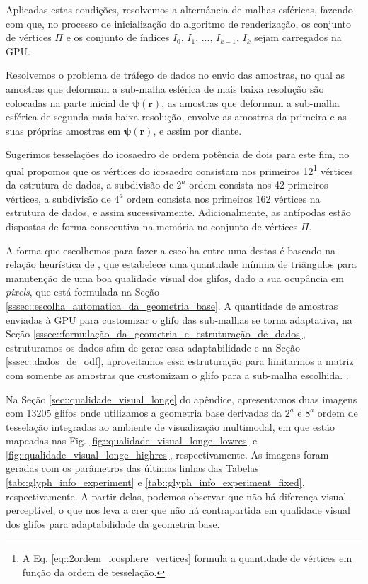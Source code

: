 \documentclass[
    12pt,                %
    oneside,            %
    a4paper,            %
    english,            %
    french,                %
    spanish,            %
    brazil                %
    ]{abntex2}
\begin{document}
Aplicadas estas condições, resolvemos a alternância de malhas esféricas, fazendo com que, no processo de inicialização do algoritmo de renderização, os conjunto de vértices $\Pi$ e os conjunto de índices $I_0$, $I_1$, ..., $I_{k-1}$, $I_k$ sejam carregados na GPU.

Resolvemos o problema de tráfego de dados no envio das amostras, no qual as amostras que deformam a sub-malha esférica de mais baixa resolução são colocadas na parte inicial de $\boldsymbol{\psi(\mathbf{r})}$, as amostras que deformam a sub-malha esférica de segunda mais baixa resolução, envolve as amostras da primeira e as suas próprias amostras em $\boldsymbol{\psi(\mathbf{r})}$, e assim por diante.

Sugerimos tesselações do icosaedro de ordem potência de dois para este fim, no qual propomos que os vértices do icosaedro consistam nos primeiros 12\footnote{A Eq. \ref{eq::2ordem_icosphere_vertices} formula a quantidade de vértices em função da ordem de tesselação.} vértices da estrutura de dados, a subdivisão de $2^a$ ordem consista nos 42 primeiros vértices, a subdivisão de $4^a$ ordem consista nos primeiros 162 vértices na estrutura de dados, e assim sucessivamente. Adicionalmente, as antípodas estão dispostas de forma consecutiva na memória no conjunto de vértices $\Pi$.

A forma que escolhemos para fazer a escolha entre uma destas é baseado na relação heurística de , que estabelece uma quantidade mínima de triângulos para manutenção de uma boa qualidade visual dos glifos, dado a sua ocupância em \textit{pixels}, que está formulada na Seção %
\ref{sssec::escolha_automatica_da_geometria_base}. A quantidade de amostras enviadas à GPU para customizar o glifo das sub-malhas se torna adaptativa, na Seção \ref{sssec::formulação_da_geometria_e_estruturação_de_dados}, estruturamos os dados afim de gerar essa adaptabilidade e na Seção \ref{sssec::dados_de_odf}, aproveitamos essa estruturação para limitarmos a matriz com somente as amostras que customizam o glifo para a sub-malha escolhida.
.

Na Seção \ref{sec::qualidade_visual_longe} do apêndice, apresentamos duas imagens com 13205 glifos onde utilizamos a geometria base derivadas da $2^a$ e $8^a$ ordem de tesselação integradas ao ambiente de visualização multimodal, em que estão mapeadas nas Fig. \ref{fig::qualidade_visual_longe_lowres} e \ref{fig::qualidade_visual_longe_highres}, respectivamente. As imagens foram geradas com os parâmetros das últimas linhas das Tabelas \ref{tab::glyph_info_experiment} e \ref{tab::glyph_info_experiment_fixed}, respectivamente. A partir delas, podemos observar que não há diferença visual perceptível, o que nos leva a crer que não há contrapartida em qualidade visual dos glifos para adaptabilidade da geometria base.
\end{document}
